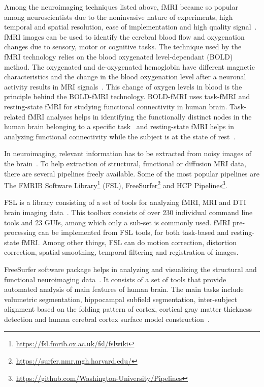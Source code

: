 Among the neuroimaging techniques listed above, fMRI became so popular among neuroscientists due to the noninvasive nature of experiments, high temporal and spatial resolution, ease of implementation and high quality signal~\cite{Bandettini2009}. fMRI images can be used to identify the cerebral blood flow and oxygenation changes due to sensory, motor or cognitive tasks. The technique used by the fMRI technology relies on the blood oxygenated level-dependant (BOLD) method. The oxygenated and de-oxygenated hemoglobin have different magnetic characteristics and the change in the blood oxygenation level after a neuronal activity results in MRI signals~\cite{doi:10.1177/0883073807313047}. This change of oxygen levels in blood is the principle behind the BOLD-fMRI technology. BOLD-fMRI uses task-fMRI and resting-state fMRI for studying functional connectivity in human brain. Task-related fMRI analyses helps in identifying the functionally distinct nodes in the human brain belonging to a specific task~\cite{task_fmri} and resting-state fMRI helps in analyzing functional connectivity while the subject is at the state of rest~\cite{SMITH2013144}.

In neuroimaging, relevant information has to be extracted from noisy images of the brain~\cite{WOOLRICH2009S173}. To help extraction of structural, functional or diffusion MRI data, there are several pipelines freely available. Some of the most popular pipelines are The FMRIB Software Library\footnote{\url{https://fsl.fmrib.ox.ac.uk/fsl/fslwiki}} (FSL), FreeSurfer\footnote{\url{https://surfer.nmr.mgh.harvard.edu/}} and HCP Pipelines\footnote{\url{https://github.com/Washington-University/Pipelines}}.
 
FSL is a library consisting of a set of tools for analyzing fMRI, MRI and DTI brain imaging data~\cite{JENKINSON2012782}. This toolbox consists of over 230 individual command line tools and 23 GUIs, among which only a sub-set is commonly used. fMRI pre-processing can be implemented from FSL tools, for both task-based and resting-state fMRI. Among other things, FSL can do motion correction, distortion correction, spatial smoothing, temporal filtering and registration of images.

FreeSurfer software package helps in analyzing and visualizing the structural and functional neuroimaging data~\cite{freesurfer_website}. It consists of a set of tools that provide automated analysis of main features of human brain. The main tasks include volumetric segmentation, hippocampal subfield segmentation, inter-subject alignment based on the folding pattern of cortex, cortical gray matter thickness detection and human cerebral cortex surface model construction~\cite{Fischl2012}. 

